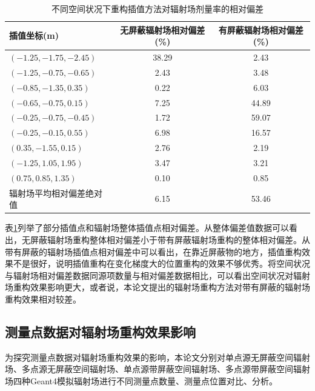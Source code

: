 \begin{table}[htbp]
    \centering
    \caption{\label{tab:test2}不同空间状况下重构插值方法对辐射场剂量率的相对偏差}
    \begin{tabular}{lcc}
        \toprule
        插值坐标(m)              & 无屏蔽辐射场相对偏差(\%) & 有屏蔽辐射场相对偏差(\%) \\
        \midrule
        $ (-1.25,-1.75,-2.45) $  & 38.29                    & 2.43                     \\
        $ (-1.25,-0.75,-0.65) $  & 2.43                     & 3.48                     \\
        $ (-0.85,-1.35,0.35) $   & 0.22                     & 6.03                     \\
        $ (-0.65,-0.75,0.15) $   & 7.25                     & 44.89                    \\
        $ (-0.25,-0.75,-0.45) $  & 1.72                     & 59.07                    \\
        $ (-0.25,-0.15,0.55) $   & 6.98                     & 16.57                    \\
        $ (0.35,-1.55,0.15) $    & 2.76                     & 2.19                     \\
        $ (-1.25,1.05,1.95) $    & 3.47                     & 3.21                     \\
        $ (0.75,0.85,1.35) $     & 0.10                     & 0.85                     \\
        辐射场平均相对偏差绝对值 & 6.15                     & 53.46                    \\
        \bottomrule
    \end{tabular}
    \label{不同空间状况下重构插值方法对辐射场剂量率的相对偏差}
\end{table}

表\ref{不同空间状况下重构插值方法对辐射场剂量率的相对偏差}列举了部分插值点和辐射场整体插值点相对偏差。从整体偏差值数据可以看出，无屏蔽辐射场重构整体相对偏差小于带有屏蔽辐射场重构的整体相对偏差。从带有屏蔽的辐射场插值点相对偏差中可以看出，在靠近屏蔽物的地方，插值重构效果不是很好，说明插值重构在变化梯度大的位置重构的效果不够优秀。将空间状况与辐射场相对偏差数据同源项数量与相对偏差数据相比，可以看出空间状况对辐射场重构效果影响更大，或者说，本论文提出的辐射场重构方法对带有屏蔽的辐射场重构效果相对较差。

\subsection{测量点数据对辐射场重构效果影响}
为探究测量点数据对辐射场重构效果的影响，本论文分别对单点源无屏蔽空间辐射场、多点源无屏蔽空间辐射场、单点源带屏蔽空间辐射场、多点源带屏蔽空间辐射场四种Geant4模拟辐射场进行不同测量点数量、测量点位置对比、分析。

